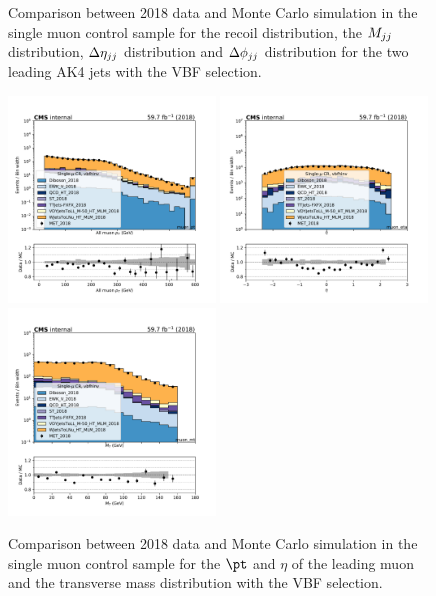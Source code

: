 \begin{figure}[htbp]
\begin{center}
    \end{center}
    \caption{Comparison between 2018 data and Monte Carlo simulation in the single muon control sample for
        the recoil distribution, the $M_{jj}$ distribution, $\Delta \eta_{jj}$ distribution 
        and $\Delta \phi_{jj}$ distribution for the two leading AK4 jets with the VBF selection.}
    \label{fig:SM_vbfhinv_2018}
\end{figure}

\begin{figure}[htbp]
    \begin{center}
        \includegraphics[width=0.49\textwidth]{fig/datamc/cr_1m_vbf/cr_1m_vbf_muon_pt_losf_2018.pdf}
        \includegraphics[width=0.49\textwidth]{fig/datamc/cr_1m_vbf/cr_1m_vbf_muon_eta_losf_2018.pdf} \\
        \includegraphics[width=0.49\textwidth]{fig/datamc/cr_1m_vbf/cr_1m_vbf_muon_mt_losf_2018.pdf}
    \end{center}
    \caption{Comparison between 2018 data and Monte Carlo simulation in the single muon control sample for
        the $\pt$ and $\eta$ of the leading muon and the transverse mass distribution with the VBF selection.}
    \label{fig:SM_2_vbfhinv_2018}
\end{figure}

